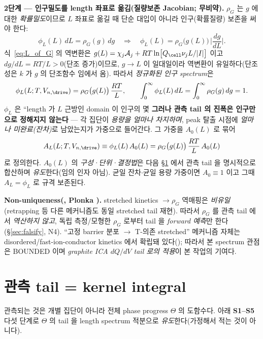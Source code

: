\textbf{2단계 — 인구밀도를 length 좌표로 옮김(질량보존 Jacobian; 무비약).} $\rho_G$ 는 $g$ 에 대한
\emph{확률밀도}이므로 $L$ 좌표로 옮길 때 단순 대입이 아니라 인구(확률질량) 보존을 써야 한다:
\begin{equation}
\phi_L(L)\,dL=\rho_G(g)\,dg
\quad\Longrightarrow\quad
\phi_L(L)=\rho_G\big(g(L)\big)\,\Big|\frac{dg}{dL}\Big|.
\label{eq:massconv}
\end{equation}
식~\eqref{eq:L_of_G} 의 역변환은 $g(L)=\chi_j\mathcal A_j+RT\ln\!\big[Q_\cell\nu_j L/|I|\big]$ 이고
$dg/dL=RT/L>0$(단조 증가)이므로, $g\!\to\!L$ 이 일대일이라 역변환이 유일하다(단조성은 $k$ 가 $g$ 의 단조함수
임에서 옴). 따라서 \emph{정규화된 인구 spectrum}은
\begin{equation}
\phi_L(L;T,V_{n,\drive})=\rho_G\big(g(L)\big)\,\frac{RT}{L},\qquad
\int_0^\infty \phi_L(L)\,dL=\int_0^\infty \rho_G(g)\,dg=1.
\label{eq:popspectrum}
\end{equation}
$\phi_L$ 은 ``length 가 $L$ 근방인 domain 이 인구의 몇 %
\textbf{그러나 관측 tail 의 진폭은 인구만으로 정해지지 않는다} — 각 집단이 \emph{용량을 얼마나 차지하며}, peak
탈출 시점에 \emph{얼마나 미완료(잔차)}로 남았는지가 가중으로 들어간다. 그 가중을 $A_0(L)$ 로 묶어
\begin{equation}
A_L(L;T,V_{n,\drive})\equiv \phi_L(L)\,A_0(L)=\rho_G\big(g(L)\big)\,\frac{RT}{L}\,A_0(L)
\label{eq:spectrum}
\end{equation}
로 정의한다. $A_0(L)$ 의 \emph{구성·단위·결정법}은 다음 \S\ref{sec:kernel} 에서 관측 tail 을 명시적으로
합산하며 \emph{유도}한다(임의 인자 아님). 균일 잔차$\cdot$균일 용량 가중이면 $A_0\equiv1$ 이고 그때
$A_L=\phi_L$ 로 규격 보존된다.
\begin{boundbox}
\textbf{Non-uniqueness(, Plonka \cite{plonka2001}).} stretched kinetics $\to\rho_G$ 역매핑은
\emph{비유일}(retrapping 등 다른 메커니즘도 동일 stretched tail 재현). 따라서 $\rho_G$ 를 관측 tail 에서
\emph{역산하지 않고}, 독립 측정/모형한 $\rho_G$ 로부터 tail 을 \emph{forward 예측}만 한다(\S\ref{sec:falsify}, N4).
``고정 barrier 분포 $\to$ T-의존 stretched'' 메커니즘 자체는 disordered/fast-ion-conductor kinetics 에서
확립돼 있다(\cite{macdonald2000,lindsey1980}); 따라서 본 spectrum 관점은 BOUNDED 이며 \emph{graphite ICA
$dQ/dV$ tail 로의 적용}이 본 작업의 기여다.
\end{boundbox}

\section{관측 tail = kernel integral}\label{sec:kernel}
관측되는 것은 개별 집단이 아니라 전체 phase progress $\Theta$ 의 도함수다. 아래 \textbf{S1--S5} 다섯 단계로
$\Theta$ 의 tail 을 length spectrum 적분으로 \emph{유도}한다(가정해서 적는 것이 아니다).

